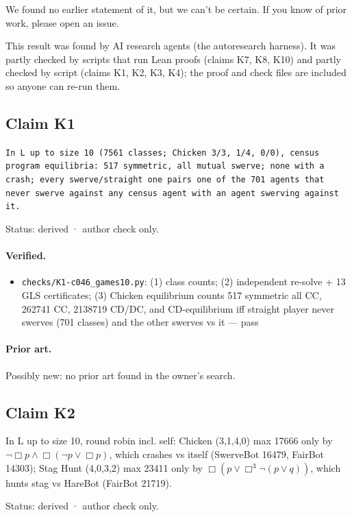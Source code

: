 \documentclass{article}
\begin{document}
We found no earlier statement of it, but we can't be certain. If you know of prior work, please open an issue.

This result was found by AI research agents (the autoresearch harness). It was partly checked by scripts that run Lean proofs (claims K7, K8, K10) and partly checked by script (claims K1, K2, K3, K4); the proof and check files are included so anyone can re-run them.

\subsection*{Claim K1}

\texttt{In L up to size 10 (7561 classes; Chicken 3/3, 1/4, 0/0), census program equilibria: 517 symmetric, all mutual swerve; none with a crash; every swerve/straight one pairs one of the 701 agents that never swerve against any census agent with an agent swerving against it.}

Status: derived · author check only.

\paragraph{Verified.}
\begin{itemize}
\item \texttt{checks/K1-c046\_games10.py}: (1) class counts; (2) independent re-solve + 13 GLS certificates; (3) Chicken equilibrium counts 517 symmetric all CC, 262741 CC, 2138719 CD/DC, and CD-equilibrium iff straight player never swerves (701 classes) and the other swerves vs it --- pass
\end{itemize}

\paragraph{Prior art.} Possibly new: no prior art found in the owner's search.

\subsection*{Claim K2}

In L up to size 10, round robin incl. self: Chicken (3,1,4,0) max 17666 only by $\neg\Box p\wedge\Box(\neg p\vee\Box p)$, which crashes vs itself (SwerveBot 16479, FairBot 14303); Stag Hunt (4,0,3,2) max 23411 only by $\Box(p\vee\Box^3\neg(p\vee q))$, which hunts stag vs HareBot (FairBot 21719).

Status: derived · author check only.
\end{document}
